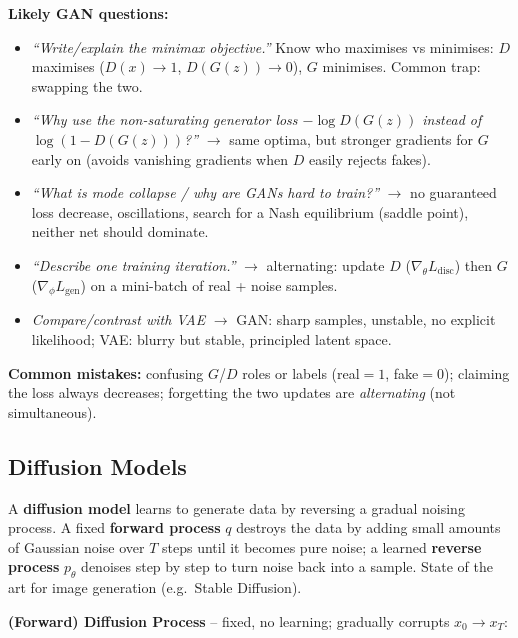 \documentclass[10pt,a4paper]{article}
\begin{document}
	\begin{examtipbox}
		\textbf{Likely GAN questions:}
		\begin{itemize}
			\item \emph{``Write/explain the minimax objective.''} Know who maximises vs minimises: $D$ maximises ($D(x)\to1$, $D(G(z))\to0$), $G$ minimises. Common trap: swapping the two.
			\item \emph{``Why use the non-saturating generator loss $-\log D(G(z))$ instead of $\log(1-D(G(z)))$?''} $\to$ same optima, but stronger gradients for $G$ early on (avoids vanishing gradients when $D$ easily rejects fakes).
			\item \emph{``What is mode collapse / why are GANs hard to train?''} $\to$ no guaranteed loss decrease, oscillations, search for a Nash equilibrium (saddle point), neither net should dominate.
			\item \emph{``Describe one training iteration.''} $\to$ alternating: update $D$ ($\nabla_\theta L_{\text{disc}}$) then $G$ ($\nabla_\phi L_{\text{gen}}$) on a mini-batch of real + noise samples.
			\item \emph{Compare/contrast with VAE} $\to$ GAN: sharp samples, unstable, no explicit likelihood; VAE: blurry but stable, principled latent space.
		\end{itemize}
		\textbf{Common mistakes:} confusing $G$/$D$ roles or labels (real$=1$, fake$=0$); claiming the loss always decreases; forgetting the two updates are \emph{alternating} (not simultaneous).
	\end{examtipbox}

	\subsection{Diffusion Models}

	\begin{definitionbox}
		A \textbf{diffusion model} learns to generate data by reversing a gradual noising process. A fixed \textbf{forward process} $q$ destroys the data by adding small amounts of Gaussian noise over $T$ steps until it becomes pure noise; a learned \textbf{reverse process} $p_\theta$ denoises step by step to turn noise back into a sample. State of the art for image generation (e.g.\ Stable Diffusion).
	\end{definitionbox}

	\textbf{(Forward) Diffusion Process} -- fixed, no learning; gradually corrupts $x_0\to x_T$:
\end{document}
